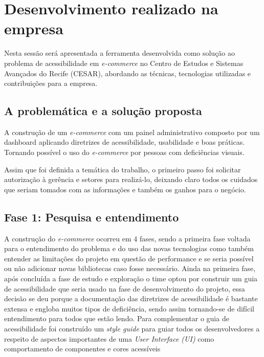 \section{Desenvolvimento realizado na empresa}
\label{sec:desenvolvimento}

{Nesta sessão será apresentada a ferramenta desenvolvida como solução ao problema de acessibilidade em  \textit{e-commerce} no Centro de Estudos e Sistemas Avançados do Recife (CESAR), abordando as técnicas, tecnologias utilizadas e contribuições para a empresa.}

\subsection{A problemática e a solução proposta}
{A construção de um \textit{e-commerce} com um painel administrativo composto por um dashboard aplicando diretrizes de acessibilidade, usabilidade e boas práticas. Tornando possível o uso do \textit{e-commerce} por pessoas com deficiências visuais. 

Assim que foi definida a temática do trabalho, o primeiro passo foi solicitar autorização à gerência e setores para realizá-lo, deixando claro todos os cuidados que seriam tomados com as informações e também os ganhos para o negócio.}

\subsection{Fase 1: Pesquisa e entendimento}
{A construção do \textit{e-commerce} ocorreu em 4 fases, sendo a primeira fase voltada para o entendimento do problema e do uso das novas tecnologias como também entender as limitações do projeto em questão de performance e se seria possível ou não adicionar novas bibliotecas caso fosse necessário. Ainda na primeira fase, após concluída a fase de estudo e exploração o time optou por construir um guia de acessibilidade que seria usado na fase de desenvolvimento do projeto, essa decisão se deu porque a documentação das diretrizes de acessibilidade é bastante extensa e engloba muitos tipos de deficiência, sendo assim tornando-se de difícil entendimento para todos que estão lendo. Para complementar o guia de acessibilidade foi construído um \textit{style guide} para guiar todos os desenvolvedores a respeito de aspectos importantes de uma \textit{User Interface (UI)} como  comportamento de componentes e cores acessíveis}


